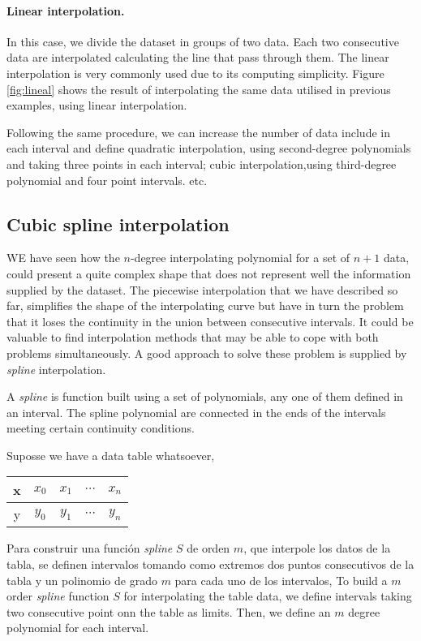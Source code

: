 \begin{paracol}{2}
\paragraph{Linear interpolation.}  In this case, we divide the dataset in groups of two data. Each two consecutive data are interpolated calculating the line that pass through them. The linear interpolation is very commonly used due to its computing simplicity. Figure \ref{fig:lineal} shows the result of interpolating the same data utilised in previous examples, using linear interpolation. 

Following the same procedure, we can increase the number of data include in each interval and define quadratic interpolation, using second-degree polynomials and taking three points in each interval; cubic interpolation,using  third-degree polynomial and four point intervals. etc.

\subsection{Cubic spline interpolation}
WE have seen how the $n$-degree interpolating polynomial for a set of $n+1$ data, could present a quite complex shape that does not represent well the information supplied by the dataset. The piecewise interpolation that we have described so far, simplifies the shape of the interpolating curve but have in turn the problem that it loses the continuity in the union between consecutive intervals. It could be valuable to find interpolation methods that may be able to cope with both problems simultaneously. A good approach to solve these problem is supplied by \emph{spline} interpolation. 

A \emph{spline} is function built using a set of polynomials, any one of them defined in an interval. The spline polynomial are connected in the ends of the intervals meeting certain continuity conditions.

Suposse we have a data table whatsoever,
\end{paracol}
\begin{table}[h]
\centering
\begin{tabular}{c|cccc}
x&$x_0$&$x_1$&$\cdots$&$x_n$\\
\hline
y&$y_0$&$y_1$&$\cdots$&$y_n$
\end{tabular}
\end{table}
\begin{paracol}{2}
Para construir una función \emph{spline} $S$ de orden $m$, que interpole los datos de la tabla, se definen intervalos tomando como extremos dos puntos consecutivos de la tabla y un polinomio de grado $m$ para cada uno de los intervalos,
\switchcolumn
To build a $m$ order \emph{spline} function $S$ for interpolating the table data, we define intervals taking two consecutive point onn the table as limits. Then, we define an $m$ degree polynomial for each interval.
\end{paracol}
